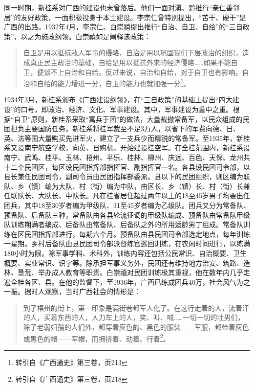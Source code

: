 同一时期，新桂系对广西的建设也未曾落后。他们一面对滇、黔推行“亲仁善邻居”的友好政策，一面积极投身于本土建设。李宗仁曾特别提出，“苦干、硬干”是广西的出路。1932年4月，李宗仁、白崇禧提出推行“自治、自卫、自给”的“三自政策”，以之为施政纲领。白崇禧如是阐释该政策：

\begin{quote}
自卫是用以抵抗敌人军事的侵略，自治是用以巩固我们下层政治的组织，造成真正民主政治的基础，自给是用以抵抗外来的经济侵略……如果不能自卫，便谈不上自治和自给。反过来说，自治和自给，对于自卫也有影响。自治和自给的能力增进一分，自卫的能力也就加强一分\footnote{转引自《广西通史》第三卷，页213}。
\end{quote}

1934年3月，新桂系颁布《广西建设纲领》，在“三自政策”的基础上提出“四大建设”的口号，即政治、经济、文化、军事建设。其中，军事建设为重中之重。根据“自卫”原则，新桂系采取“寓兵于团”的做法，大量裁撤常备军，以民众组成的民团担负主要国防任务。新桂系将桂军裁至不足3万人，以省下的军费向德、日、英、法等国大量购买先进军火，建立了一支兵少而精锐的常备军。至1935年，新桂系又设南宁航空学校，向英、日购机，开始建设桂空军。在全桂范围内，新桂系设南宁、武鸣、桂平、玉林、梧州、平乐、桂林、柳州、庆远、百色、天保、龙州共十二个民团区，每区设民团指挥部指挥官、副指挥官一名。各县设民团司令部，以县长兼任民团司令，副司令员由民团指挥部委派。县以下的民团组织，则区编为联队、乡（镇）编为大队、村（街）编为中队，由区长、乡（镇）长、村（街）长兼任联队长、大队长、中队长。凡在桂省居住超过两年以上的18至45岁男子均要出任团兵，其中18至30岁者编为甲级队、31至45岁者编为乙级队。团兵又分为常备队、预备队、后备队三种，常备队由各县轮流征调的甲级队编成、预备队由常备队甲级队训练期满者编成、后备队由常备队、后备队之外的所用适龄男丁组成。常备队训练在区民团指挥部进行，每期六个月。预备队由县民团司令部选定地点，每年训练一星期。乡村后备队由县民团司令部派督练官巡回训练，在农闲时间进行，以练满180小时为限。除军事学科、术科外，训练内容还包括公民常识、自治概要、卫生概要、实业常识、识字等。除承担军事义务外，民团还有维持地方治安、筑路、造林、垦荒、举办成人教育等职责。白崇禧对民团训练极其重视，他在数年内几乎走遍全桂各区、县。在他的监督下，至1936年，广西已练成团兵40万，社会风气为之一振。据时人观察，当时广西社会的情形是：

\begin{quote}

到了梧州的街上，第一印象是满街巷都军人化了。在这行走着的人，流着汗的人，买着东西的人，人力车上的人，笑、叫、喊……一切一切的壮男们，除了老弱妇孺的人们外，都穿着灰色的、黑色的服装——军服，都带着灰色或黑色的帽——军帽，而拥挤着、动着、行着\footnote{转引自《广西通史》第三卷，页218}。
\end{quote}

